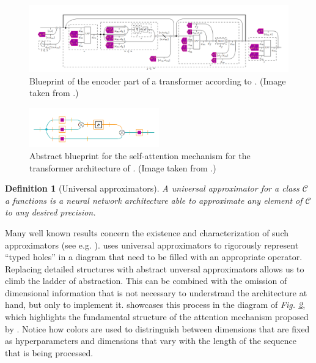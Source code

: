 \documentclass[11pt,a4paper,openright,twoside]{report}
\newcounter{mycounter}
\theoremstyle{plain}
\newtheorem{definition}[mycounter]{Definition}
\theoremstyle{definition}
\newcommand\dblquote[1]{\textquotedblleft #1\textquotedblright}
\begin{document}
\begin{figure}[h]
  \begin{center}
    \includegraphics[width=\textwidth]{figures/khatri_transformer.png}
    \caption[Transformer blueprint according to \cite{khatri2024anatomy}]{Blueprint of the encoder part of a transformer according to \cite{khatri2024anatomy}. (Image taken from \cite{khatri2024anatomy}.)}
    \label{fig: khatritransformer}
  \end{center}
\end{figure}

\begin{figure}[h]
  \begin{center}
    \includegraphics[width=0.5\textwidth]{figures/khatri_attention.png}
    \caption[Abstract blueprint for self-attention]{Abstract blueprint for the self-attention mechanism for the transformer architecture of \cite{vaswani2017attention}. (Image taken from \cite{khatri2024anatomy}.)}
    \label{fig: khatriattention}
  \end{center}
\end{figure}

\begin{definition}[Universal approximators]
  A universal approximator for a class $\mathcal{C}$ a functions is a neural network architecture able to approximate any element of $\mathcal{C}$ to any desired precision.
\end{definition}


Many well known results concern the existence and characterization of such approximators (see e.g. \cite{cybenko1989approximation}). \cite{khatri2024anatomy} uses universal approximators to rigorously represent \dblquote{typed holes} in a diagram that need to be filled with an appropriate operator. Replacing detailed structures with abstract unversal approximators allows us to climb the ladder of abstraction. This can be combined with the omission of dimensional information that is not necessary to understrand the architecture at hand, but only to implement it. \cite{khatri2024anatomy} showcases this process in the diagram of \textit{Fig. \ref{fig: khatriattention}}, which highlights the fundamental structure of the attention mechanism proposed by \cite{vaswani2017attention}. Notice how colors are used to distringuish between dimensions that are fixed as hyperparameters and dimensions that vary with the length of the sequence that is being processed.
\end{document}
